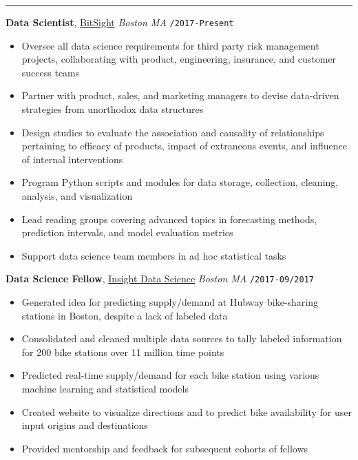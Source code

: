 \documentclass[10pt,english]{report}
\begin{document}
\vspace{5mm}

{}
\vspace{1mm}\hrule
\vspace{2mm}

\textbf{Data Scientist}, \textcolor{blue}{\href{https://www.bitsight.com}{BitSight}} \hfill \textit{Boston MA} \texttt{/2017-Present}
\vspace{1mm}
\begin{itemize}
\item Oversee all data science requirements for third party risk management projects, collaborating with product, engineering, insurance, and customer success teams
\item Partner with product, sales, and marketing managers to devise data-driven strategies from unorthodox data structures
\item Design studies to evaluate the association and causality of relationships pertaining to efficacy of products, impact of extraneous events, and influence of internal interventions
\item Program Python scripts and modules for data storage, collection, cleaning, analysis, and visualization
\item Lead reading groups covering advanced topics in forecasting methods, prediction intervals, and model evaluation metrics
\item Support data science team members in ad hoc statistical tasks
\end{itemize}

\vspace{1mm}

\textbf{Data Science Fellow}, \textcolor{blue}{\href{https://www.insightdatascience.com}{Insight Data Science}} \hfill \textit{Boston MA} \texttt{/2017-09/2017}
\begin{itemize}
\item Generated idea for predicting supply/demand at Hubway bike-sharing stations in Boston, despite a lack of labeled data
\item Consolidated and cleaned multiple data sources to tally labeled information for 200 bike stations over 11 million time points
\item Predicted real-time supply/demand for each bike station using various machine learning and statistical models
\item Created website to visualize directions and to predict bike availability for user input origins and destinations
\item Provided mentorship and feedback for subsequent cohorts of fellows
\end{itemize}
\end{document}
